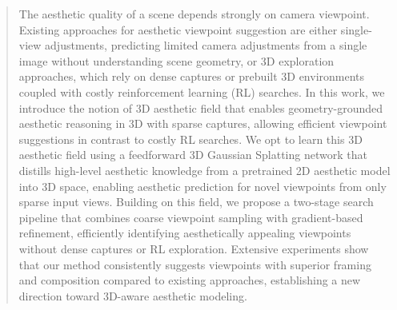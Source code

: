\begin{abstract}
The aesthetic quality of a scene depends strongly on camera viewpoint.
Existing approaches for aesthetic viewpoint suggestion are either single-view adjustments, predicting limited camera adjustments from a single image without understanding scene geometry, or 3D exploration approaches, which rely on dense captures or prebuilt 3D environments coupled with costly reinforcement learning (RL) searches. In this work, we introduce the notion of 3D aesthetic field that enables geometry-grounded aesthetic reasoning in 3D with sparse captures, allowing efficient viewpoint suggestions in contrast to costly RL searches.
We opt to learn this 3D aesthetic field using a feedforward 3D Gaussian Splatting network that distills high-level aesthetic knowledge from a pretrained 2D aesthetic model into 3D space, enabling aesthetic prediction for novel viewpoints from only sparse input views. Building on this field, we propose a two-stage search pipeline that combines coarse viewpoint sampling with gradient-based refinement, efficiently identifying aesthetically appealing viewpoints without dense captures or RL exploration. Extensive experiments show that our method consistently suggests viewpoints with superior framing and composition compared to existing approaches, establishing a new direction toward 3D-aware aesthetic modeling.
\end{abstract}




